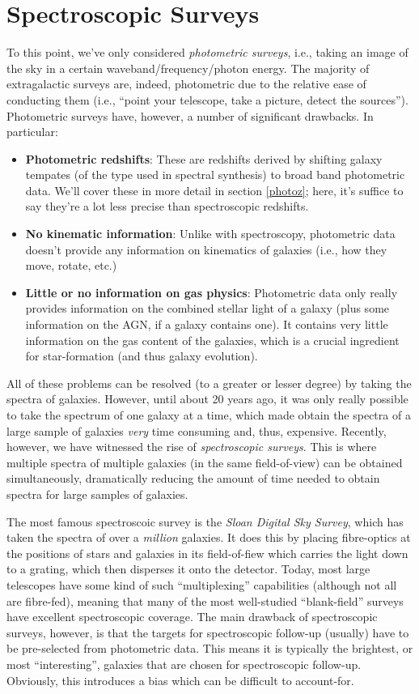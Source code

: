 \documentclass[11pt]{article}
\begin{document}
\section{Spectroscopic Surveys}
To this point, we've only considered {\it photometric surveys}, i.e.,
taking an image of the sky in a certain waveband/frequency/photon
energy. The majority of extragalactic surveys are, indeed, photometric
due to the relative ease of conducting them (i.e., ``point your
telescope, take a picture, detect the sources''). Photometric surveys
have, however, a number of significant drawbacks. In particular:
\begin{itemize}
\item {\bf Photometric redshifts}: These are redshifts derived by
  shifting galaxy tempates (of the type used in spectral synthesis) to
  broad band photometric data. We'll cover these in more detail in
  section \ref{photoz}; here, it's suffice to say they're a lot less
  precise than spectroscopic redshifts.
\item {\bf No kinematic information}: Unlike with spectroscopy,
  photometric data doesn't provide any information on kinematics of
  galaxies (i.e., how they move, rotate, etc.)
\item {\bf Little or no information on gas physics}: Photometric data
  only really provides information on the combined stellar light of a
  galaxy (plus some information on the AGN, if a galaxy contains
  one). It contains very little information on the gas content of the
  galaxies, which is a crucial ingredient for star-formation (and thus
  galaxy evolution).
\end{itemize}

All of these problems can be resolved (to a greater or lesser degree)
by taking the spectra of galaxies. However, until about 20 years ago,
it was only really possible to take the spectrum of one galaxy at a
time, which made obtain the spectra of a large sample of galaxies {\it
  very} time consuming and, thus, expensive. Recently, however, we
have witnessed the rise of {\it spectroscopic surveys}. This is where
multiple spectra of multiple galaxies (in the same field-of-view) can
be obtained simultaneously, dramatically reducing the amount of time
needed to obtain spectra for large samples of galaxies.

The most famous spectroscoic survey is the {\it Sloan Digital Sky
  Survey}, which has taken the spectra of over a {\it million}
galaxies. It does this by placing fibre-optics at the positions of
stars and galaxies in its field-of-fiew which carries the light down
to a grating, which then disperses it onto the detector. Today, most large
telescopes have some kind of such ``multiplexing'' capabilities (although
not all are fibre-fed), meaning that many of the most well-studied
``blank-field'' surveys have excellent spectroscopic coverage.  The
main drawback of spectroscopic surveys, however, is that the targets
for spectroscopic follow-up (usually) have to be pre-selected from
photometric data. This means it is typically the brightest, or most
``interesting'', galaxies that are chosen for spectroscopic
follow-up. Obviously, this introduces a bias which can be difficult to
account-for.
\end{document}

